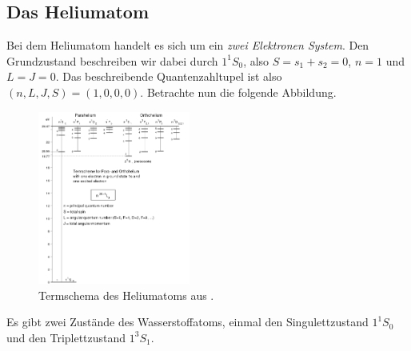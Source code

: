 \documentclass{subfiles}
\begin{document}
    \subsection{Das Heliumatom}
        Bei dem Heliumatom handelt es sich um ein \emph{zwei Elektronen System}. Den Grundzustand beschreiben wir dabei durch $1^1S_0$, also $S = s_1 + s_2 = 0$, $n = 1$ und $L = J = 0$. Das beschreibende Quantenzahltupel ist also $(n,L,J,S) = (1,0,0,0)$. Betrachte nun die folgende Abbildung.
        \begin{figure}
            \centering
            \includegraphics[width=5cm]{../Bilddateien/Helium-term-scheme.svg.png}
            \caption{Termschema des Heliumatoms aus \cite{wiki:helium-atom}.}
        \end{figure}
        Es gibt zwei Zustände des Wasserstoffatoms, einmal den Singulettzustand $1^1S_0$ und den Triplettzustand $1^3S_1$. 
\end{document}
